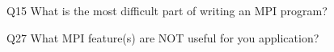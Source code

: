 \begin{description}%
\item{Q15} What is the most difficult part of writing an MPI program?%
\item{Q27} What MPI feature(s) are NOT useful for you application?%
\end{description}%
